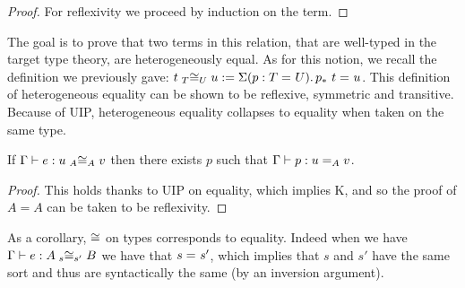 \begin{proof}
  For reflexivity we proceed by induction on the term.
\end{proof}


%

The goal is to prove that two terms in this relation, that are well-typed in the
target type theory, are heterogeneously equal. As for this notion, we recall
the definition we previously gave:
$\Heq{T}{t}{U}{u} := \Sum{p:\Eq{}{T}{U}} \Eq{}{\transpo{p}\ t}{u}$.
%
This definition of heterogeneous equality can be shown to be
reflexive, symmetric and transitive. Because of UIP, heterogeneous
equality collapses to equality when taken on the same type.

\begin{lemma}
  \label{lem:uip-cong}
  If $\isterm{\Ga}{e}{\Heq{A}{u}{A}{v}}$
  then there exists $p$ such that $\isterm{\Ga}{p}{\Eq{A}{u}{v}}$.
\end{lemma}

\begin{proof}
  This holds thanks to UIP on equality, which implies K, and so the
  proof of $A = A$ can be taken to be reflexivity.
\end{proof}

\begin{remark}
  As a corollary, $\Heqs$ on types corresponds to equality.
  Indeed when we have $\isterm{\Ga}{e}{\Heq{s}{A}{s'}{B}}$ we have
  that $\Eq{}{s}{s'}$, which implies that $s$ and $s'$ have the same sort
  and thus are syntactically the same (by an inversion argument).
\end{remark}

